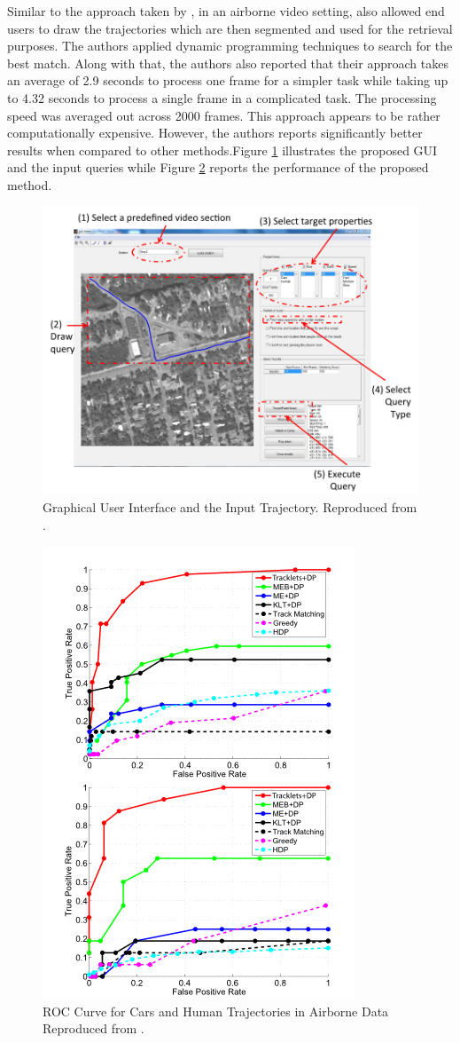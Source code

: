 Similar to the approach taken by \cite{lai2015video}, in an airborne video setting,  also allowed end users to draw the trajectories which are then segmented and used for the retrieval purposes. The authors applied dynamic programming techniques to search for the best match. Along with that, the authors also reported that their approach takes an average of 2.9 seconds to process one frame for a simpler task while taking up to 4.32 seconds to process a single frame in a complicated task. The processing speed was averaged out across 2000 frames. This approach appears to be rather computationally expensive. However, the authors reports significantly better results when compared to other methods.Figure \ref{fig:drawquery2} illustrates the proposed GUI and the input queries while Figure \ref{fig:rocresult} reports the performance of the proposed method.


\begin{figure}[hbt!]\centering
\includegraphics[width=.6\textwidth]{image/lit/trajdraw2.PNG}
\caption[Graphical User Interface and the Input Trajectory.]
{Graphical User Interface and the Input Trajectory.
Reproduced from .}
\label{fig:drawquery2}
\end{figure}

\begin{figure}[hbt!]\centering
\includegraphics[width=.6\textwidth]{image/lit/roc.PNG}
\caption[ROC Curve for Cars and Human Trajectories in Airborne Data.]
{ROC Curve for Cars and Human Trajectories in Airborne Data
Reproduced from .}
\label{fig:rocresult}
\end{figure}
